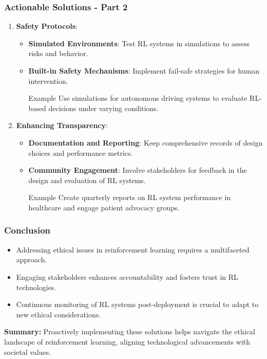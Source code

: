 \documentclass[aspectratio=169]{beamer}
\begin{document}
\begin{frame}[fragile]
    \frametitle{Actionable Solutions - Part 2}
    \begin{enumerate}[resume]
        \item \textbf{Safety Protocols}:
          \begin{itemize}
              \item \textbf{Simulated Environments}: Test RL systems in simulations to assess risks and behavior.
              \item \textbf{Built-in Safety Mechanisms}: Implement fail-safe strategies for human intervention.
                \begin{block}{Example}
                    Use simulations for autonomous driving systems to evaluate RL-based decisions under varying conditions.
                \end{block}
          \end{itemize}

        \item \textbf{Enhancing Transparency}:
          \begin{itemize}
              \item \textbf{Documentation and Reporting}: Keep comprehensive records of design choices and performance metrics.
              \item \textbf{Community Engagement}: Involve stakeholders for feedback in the design and evaluation of RL systems.
                \begin{block}{Example}
                    Create quarterly reports on RL system performance in healthcare and engage patient advocacy groups.
                \end{block}
          \end{itemize}
    \end{enumerate}
\end{frame}

\begin{frame}[fragile]
    \frametitle{Conclusion}
    \begin{itemize}
        \item Addressing ethical issues in reinforcement learning requires a multifaceted approach.
        \item Engaging stakeholders enhances accountability and fosters trust in RL technologies.
        \item Continuous monitoring of RL systems post-deployment is crucial to adapt to new ethical considerations.
    \end{itemize}
    
    \textbf{Summary:} Proactively implementing these solutions helps navigate the ethical landscape of reinforcement learning, aligning technological advancements with societal values.
\end{frame}
\end{document}
